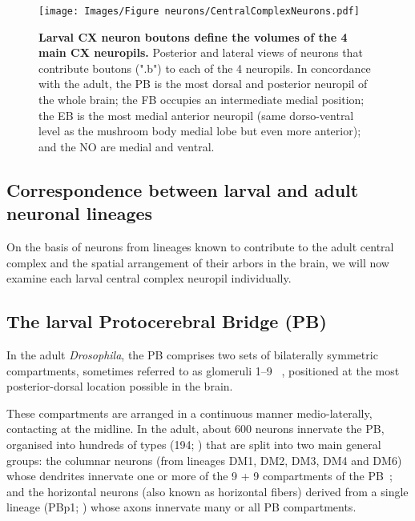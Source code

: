 \documentclass{article}
\begin{document}
    \begin{figure}
        \centering
        \texttt{[image: Images/Figure neurons/CentralComplexNeurons.pdf]}
        \caption{\textbf{Larval CX neuron boutons define the volumes of the 4 main CX neuropils.} Posterior and lateral views of neurons that contribute boutons (".b") to each of the 4 neuropils. In concordance with the adult, the PB is the most dorsal and posterior neuropil of the whole brain; the FB occupies an intermediate medial position; the EB is the most medial anterior neuropil (same dorso-ventral level as the mushroom body medial lobe but even more anterior); and the NO are medial and ventral.}
        \label{fig:cxneurons}
     \end{figure}   



\subsection{Correspondence between larval and adult neuronal lineages}

On the basis of neurons from lineages known to contribute to the adult central complex and the spatial arrangement of their arbors in the brain, we will now examine each larval central complex neuropil individually.


\subsection{The larval Protocerebral Bridge (PB)}


In the adult \textit{Drosophila}, the PB comprises two sets of bilaterally symmetric compartments, sometimes referred to as glomeruli 1–9 ~\cite{hulse2021connectome}, positioned at the most posterior-dorsal location possible in the brain.

These compartments are arranged in a continuous manner medio-laterally, contacting at the midline.
In the adult, about 600 neurons innervate the PB, organised into hundreds of types (194; \citep{wolff2015neuroarchitecture}) that are split into two main general groups: the columnar neurons (from lineages DM1, DM2, DM3, DM4 and DM6) whose dendrites innervate one or more of the 9 + 9 compartments of the PB~\citep{wolff2015neuroarchitecture}; and the horizontal neurons (also known as horizontal fibers) derived from a single lineage (PBp1; \citep{andrade2019developmentally}) whose axons innervate many or all PB compartments.
\end{document}
